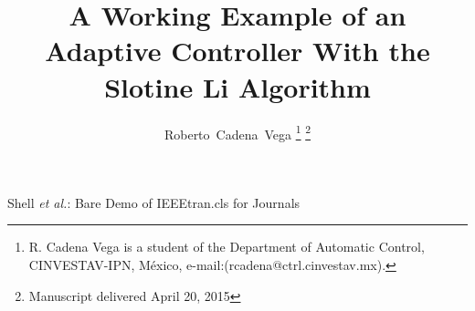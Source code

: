 \documentclass[journal]{IEEEtran}
\begin{document}
%
\title{A Working Example of an Adaptive Controller
    With the Slotine Li Algorithm}

%
%

\author{Roberto~Cadena~Vega%
\thanks{R. Cadena Vega is a student of the Department of Automatic Control,
    CINVESTAV-IPN, México, e-mail:(rcadena@ctrl.cinvestav.mx).}%
\thanks{Manuscript delivered April 20, 2015}}

% 
%

%
{Shell \MakeLowercase{\textit{et al.}}: Bare Demo of IEEEtran.cls for Journals}
% 
\end{document}
